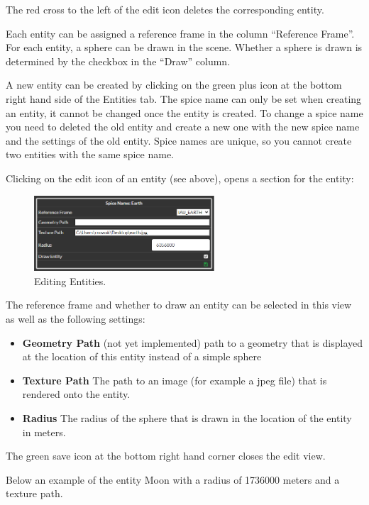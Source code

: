 The red cross to the left of the edit icon deletes the corresponding
entity.

Each entity can be assigned a reference frame in the column ``Reference
Frame''. For each entity, a sphere can be drawn in the scene. Whether a
sphere is drawn is determined by the checkbox in the ``Draw'' column.

A new entity can be created by clicking on the green plus icon at the
bottom right hand side of the Entities tab. The spice name can only be
set when creating an entity, it cannot be changed once the entity is
created. To change a spice name you need to deleted the old entity and
create a new one with the new spice name and the settings of the old
entity. Spice names are unique, so you cannot create two entities with
the same spice name.

Clicking on the edit icon of an entity (see above), opens a section for
the entity:

\begin{figure}[h!]
	\centering
	\includegraphics[width=0.6\textwidth]{pics/editEntity.png}
	\caption{Editing Entities.}
\end{figure}

The reference frame and whether to draw an entity can be selected in
this view as well as the following settings:

\begin{itemize}
	\tightlist
	\item
	\textbf{Geometry Path} (not yet implemented) path to a geometry that
	is displayed at the location of this entity instead of a simple sphere
	\item
	\textbf{Texture Path} The path to an image (for example a jpeg file)
	that is rendered onto the entity.
	\item
	\textbf{Radius} The radius of the sphere that is drawn in the location
	of the entity in meters.
\end{itemize}

The green save icon at the bottom right hand corner closes the edit
view.

Below an example of the entity Moon with a radius of 1736000 meters and
a texture path.


